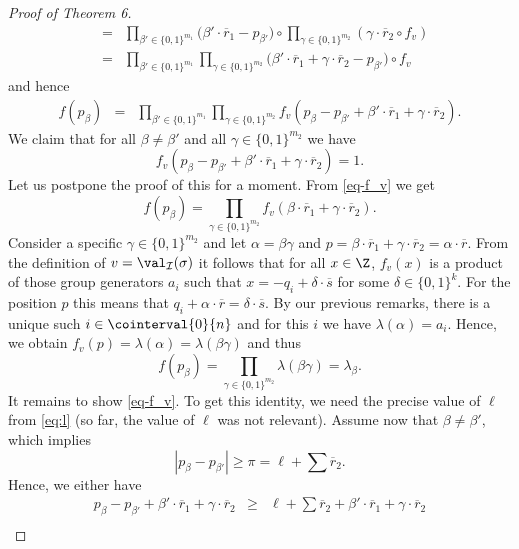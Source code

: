 \begin{proof}[Proof of Theorem 6]
\begin{eqnarray*}
& = & \prod_{\beta' \in \{0,1\}^{m_1}}   \big(\beta' \cdot \overline{r}_1 - p_{\beta'} \big) \circ \prod_{\gamma \in \{0,1\}^{m_2}} ( \gamma \cdot \overline{r}_2 \circ f_v)   \\
& = & \prod_{\beta' \in \{0,1\}^{m_1}}  \prod_{\gamma \in \{0,1\}^{m_2}}   \big(\beta' \cdot \overline{r}_1 + \gamma \cdot \overline{r}_2 - p_{\beta'} \big) \circ f_v
\end{eqnarray*}
and hence
\begin{eqnarray*}
f(p_\beta) 
&=& \prod_{\beta' \in \{0,1\}^{m_1}}  \prod_{\gamma \in \{0,1\}^{m_2}} f_v(p_{\beta} - p_{\beta'} + \beta' \cdot \overline{r}_1 + \gamma \cdot \overline{r}_2) .
\end{eqnarray*}
We claim that for all $\beta \neq \beta'$ and all $\gamma\in \{0,1\}^{m_2}$ we have
\begin{equation} \label{eq-f_v}
f_v(p_{\beta} - p_{\beta'} + \beta' \cdot \overline{r}_1 + \gamma \cdot \overline{r}_2) = 1 .
\end{equation}
Let us postpone the proof of this for a moment. From \eqref{eq-f_v} we get
\[
f(p_\beta) = \prod_{\gamma \in \{0,1\}^{m_2}} f_v(\beta \cdot \overline{r}_1 + \gamma \cdot \overline{r}_2) .
\]
Consider a specific $\gamma \in \{0,1\}^{m_2}$ and let $\alpha = \beta \gamma$ and
$p = \beta \cdot \overline{r}_1 + \gamma \cdot \overline{r}_2 = \alpha \cdot \overline{r}$.
From the definition of $v = \val_{\mathcal{I}}(\sigma)$ it follows that for all $x \in \Z$, $f_v(x)$ is a product
of those group generators $a_i$ such that $x =  -q_i + \delta \cdot \overline{s}$ for some $\delta \in \{0,1\}^k$.
For the position $p$ this means that $q_i + \alpha \cdot \overline{r} = \delta \cdot \overline{s}$. By our previous remarks,
there is a unique such $i \in\cointerval{0}{n}$ and for this $i$ we have $\lambda(\alpha) = a_i$.
Hence, we obtain $f_v(p) = \lambda(\alpha)= \lambda(\beta\gamma)$ and thus
\[
f(p_\beta) = \prod_{\gamma \in \{0,1\}^{m_2}} \lambda(\beta\gamma) = \lambda_\beta .
\]
It remains to show \eqref{eq-f_v}. To get this identity, we need the precise value of $\ell$ from \eqref{eq:l}
(so far, the  value of $\ell$ was not relevant).
Assume now that $\beta \neq \beta'$, which implies
\[
|p_{\beta} - p_{\beta'}| \geq \pi =  \ell +  \sum \overline{r}_2 .
\]
Hence, we  either have 
\begin{eqnarray*}
p_{\beta} - p_{\beta'} +\beta' \cdot \overline{r}_1 + \gamma \cdot \overline{r}_2 & \geq & \ell +  \sum \overline{r}_2 + \beta' \cdot \overline{r}_1 + \gamma \cdot \overline{r}_2 \\

\end{eqnarray*}
\end{proof}
